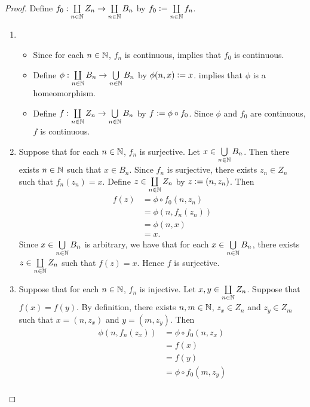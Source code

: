 \documentclass{book}
\begin{document}
	\begin{proof} Define $f_0: \coprod\limits_{n \in \mathbb{N}} Z_n \rightarrow \coprod\limits_{n \in \mathbb{N}}B_n$ by $f_0 \vcentcolon= \coprod\limits_{n \in \mathbb{N}} f_n$. 
		\begin{enumerate}
			\item 
			\begin{itemize}
				\item Since for each $n \in \mathbb{N}$, $f_n$ is continuous,  implies that $f_0$ is continuous. 
				\item Define $\phi: \coprod\limits_{n \in \mathbb{N}} B_n \rightarrow \bigcup\limits_{n \in \mathbb{N}} B_n$ by $\phi(n, x) \vcentcolon= x$.  implies that $\phi$ is a homeomorphism. 
				\item Define $f: \coprod\limits_{n \in \mathbb{N}} Z_n \rightarrow \bigcup\limits_{n \in \mathbb{N}}B_n$ by $f \vcentcolon= \phi \circ f_0$. Since $\phi$ and $f_0$ are continuous, $f$ is continuous.
			\end{itemize}
			\item Suppose that for each $n \in \mathbb{N}$, $f_n$ is surjective. Let $x \in \bigcup\limits_{n \in \mathbb{N}} B_n$. Then there exists $n \in \mathbb{N}$ such that $x \in B_n$. Since $f_n$ is surjective, there exists $z_n \in Z_n$ such that $f_n(z_n) = x$. Define $z \in \coprod\limits_{n \in \mathbb{N}} Z_n$ by $z \vcentcolon= (n, z_n)$. Then 
			\begin{align*}
				f(z)
				& = \phi \circ f_0(n, z_n) \\
				& = \phi(n, f_n(z_n)) \\
				& = \phi(n, x) \\ 
				& = x.
			\end{align*}
			Since $x \in \bigcup\limits_{n \in \mathbb{N}} B_n$ is arbitrary, we have that for each $x \in \bigcup\limits_{n \in \mathbb{N}} B_n$, there exists $z \in \coprod\limits_{n \in \mathbb{N}} Z_n$ such that $f(z) = x$. Hence $f$ is surjective.
			\item Suppose that for each $n \in \mathbb{N}$, $f_n$ is injective. Let $x, y \in \coprod\limits_{n \in \mathbb{N}} Z_n$. Suppose that $f(x) = f(y)$. By definition, there exists $n,m \in \mathbb{N}$, $z_x \in Z_n$ and $z_y \in Z_m$ such that $x = (n, z_x)$ and $y = (m, z_y)$. Then 
			\begin{align*}
				\phi(n, f_n(z_x))
				& = \phi \circ f_0 (n, z_x) \\
			 	& = f(x) \\
			 	& = f(y) \\
			 	& = \phi \circ f_0 (m, z_y) \\

\end{align*}
\end{enumerate}
\end{proof}
\end{document}

